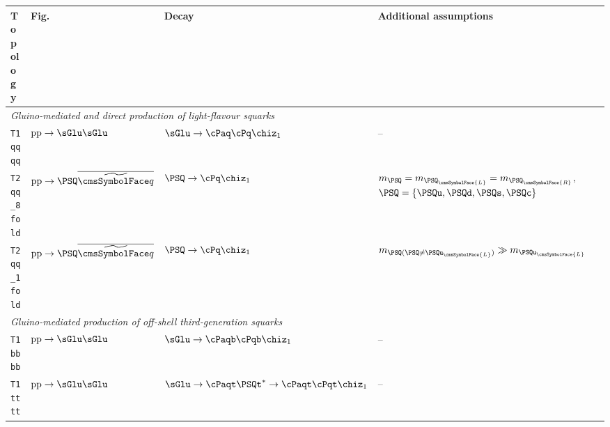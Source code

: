 \begin{table}[tb]
  \label{tab:simplified-models}
  \centering
  \footnotesize
  \begin{tabular}{ llll }
    \hline
Topology               & Fig.
                       & Decay
                       & Additional assumptions                                                         \\ [0.5ex]
\hline
\multicolumn{4}{l}{\it Gluino-mediated and direct production of light-flavour squarks}       \\ [0.5ex]
\texttt{T1qqqq}        %
                       & $\text{pp}\ra\sGlu\sGlu$
                       & $\sGlu\ra\cPaq\cPq\chiz_1$
                       & --                                                                             \\ [0.5ex]
\texttt{T2qq\_8fold}   %
                       & $\text{pp}\ra\PSQ\PASQ$        
                       & $\PSQ\ra\cPq\chiz_1$
                       & $m_{\PSQ} = m_{\PSQ_\cmsSymbolFace{L}} = m_{\PSQ_\cmsSymbolFace{R}}$,
                       $\PSQ = \{ \PSQu, \PSQd, \PSQs, \PSQc \}$                                        \\ [0.5ex]
\texttt{T2qq\_1fold}   %
                       & $\text{pp}\ra\PSQ\PASQ$         
                       & $\PSQ\ra\cPq\chiz_1$
                       & $m_{\PSQ (\PSQ \neq \PSQu_\cmsSymbolFace{L})} \gg m_{\PSQu_\cmsSymbolFace{L}}$ \\ [0.5ex]
\multicolumn{4}{l}{\it Gluino-mediated production of off-shell third-generation squarks}               \\ [0.5ex]
\texttt{T1bbbb}        %
                       & $\text{pp}\ra\sGlu\sGlu$       
                       & $\sGlu\ra\cPaqb\cPqb\chiz_1$
                       & --                                                                             \\ [0.5ex]
\texttt{T1tttt}        %
                       & $\text{pp}\ra\sGlu\sGlu$       
                       & $\sGlu\ra\cPaqt\PSQt^*\ra\cPaqt\cPqt\chiz_1$
                       & --                                                                             \\ [0.5ex]

\end{tabular}
\end{table}
